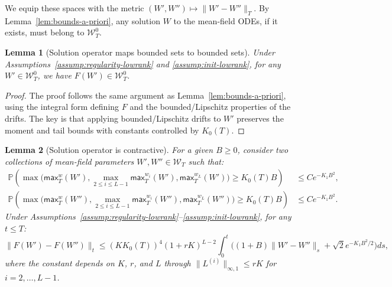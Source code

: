 \documentclass[11pt]{article}
\newcommand{\Pp}{\mathbb{P}}
\newcommand{\1}{\mathbbm{1}}
\newtheorem{lemma}{Lemma}
\begin{document}
We equip these spaces with the metric $(W',W'')\mapsto \|W'-W''\|_T$. By Lemma~\ref{lem:bounds-a-priori}, any solution $W$ to the mean-field ODEs, if it exists, must belong to $\mathcal{W}_T^0$.

\begin{lemma}[Solution operator maps bounded sets to bounded sets]
\label{lem:invariance-F}
Under Assumptions~\ref{assump:regularity-lowrank} and \ref{assump:init-lowrank}, for any $W'\in\mathcal{W}_T^0$, we have $F(W')\in\mathcal{W}_T^0$.
\end{lemma}

\begin{proof}
The proof follows the same argument as Lemma~\ref{lem:bounds-a-priori}, using the integral form defining $F$ and the bounded/Lipschitz properties of the drifts. The key is that applying bounded/Lipschitz drifts to $W'$ preserves the moment and tail bounds with constants controlled by $K_0(T)$.
\end{proof}

\begin{lemma}[Solution operator is contractive]
\label{lem:difference-F}
For a given $B\ge 0$, consider two collections of mean-field parameters $W',W''\in\mathcal{W}_T$ such that:
\begin{align*}
\Pp\!\left(\max\big(\mathsf{max}_T^w(W'), \max_{2\le i\le L-1}\mathsf{max}_T^{w_i}(W'), \mathsf{max}_T^{w_L}(W')\big)\ge K_0(T)B\right) &\le C e^{-K_1 B^2},\\
\Pp\!\left(\max\big(\mathsf{max}_T^w(W''), \max_{2\le i\le L-1}\mathsf{max}_T^{w_i}(W''), \mathsf{max}_T^{w_L}(W'')\big)\ge K_0(T)B\right) &\le C e^{-K_1 B^2}.
\end{align*}
Under Assumptions~\ref{assump:regularity-lowrank}--\ref{assump:init-lowrank}, for any $t\le T$:
\[
\|F(W')-F(W'')\|_t \le (KK_0(T))^4(1+rK)^{L-2} \int_0^t \Big((1+B)\|W'-W''\|_s + \sqrt{2}e^{-K_1 B^2/2}\Big)ds,
\]
where the constant depends on $K$, $r$, and $L$ through $\|L^{(i)}\|_{\infty,1}\le rK$ for $i=2,\ldots,L-1$.
\end{lemma}
\end{document}

